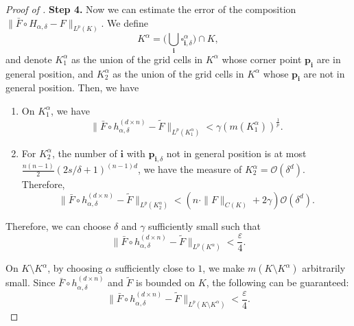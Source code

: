 \documentclass{article}
\begin{document}
\begin{proof}[Proof of ]
    \medskip
    \textbf{Step 4.}
    Now we can estimate the error of the composition $\|\bar{F}\circ H_{\alpha,\delta}-F\|_{L^p(K)}$. We define
    \[
    K^\alpha = \Big(\bigcup_{\mathbf{i}} \square_{\mathbf{i},\delta}^\alpha\Big) \cap K,
    \]
and denote $K_1^\alpha$ as the union of the grid cells in $K^\alpha$ whose corner point $\bm p_{\mathbf i}$ are in general position, and $K_2^\alpha$ as the union of the grid cells in $K^\alpha$ whose $\bm p_{\mathbf i}$ are not in general position. Then, we have
    \begin{enumerate}
        \item On $K_1^\alpha$, we have
        \begin{equation}
        \|\bar{F}\circ h_{\alpha,\delta}^{(d\times n)} - \tilde{F}\|_{L^p(K_1^\alpha)} < \gamma (m(K_1^\alpha))^{\frac{1}{p}}.
        \end{equation}
        \item For $K^\alpha_2$,  the number of $\mathbf i$ with $\bm p_{\mathbf i, \delta}$ not in general position is at most $\frac{n(n-1)}{2}(2s/\delta +1)^{(n-1)d}$, we have the measure of $K_2^\alpha = \mathcal O(\delta^{d})$.
        Therefore,
        \begin{equation}
        \|\bar{F}\circ h_{\alpha,\delta}^{(d\times n)} - \tilde{F}\|_{L^p(K_2^\alpha)} < (n\cdot \|F\|_{C(K)} + 2\gamma) \mathcal O(\delta^d).
        \end{equation}

    \end{enumerate}
    Therefore, we can choose $\delta $ and $\gamma$ sufficiently small such that
    \begin{equation}
            \|\bar{F}\circ h_{\alpha,\delta}^{(d\times n)} - \tilde{F}\|_{L^p(K^\alpha)} < \frac{\varepsilon}{4}.
    \end{equation}

On $K\setminus K^\alpha$, by choosing $\alpha$ sufficiently close to $1$, we make $m(K\setminus K^\alpha)$ arbitrarily small. Since $\bar F\circ h_{\alpha,\delta}^{(d\times n)}$ and $\tilde F$ is bounded on $K$, the following can be guaranteed:
    \begin{equation}
    \|\bar{F}\circ h_{\alpha,\delta}^{(d\times n)} - \tilde{F}\|_{L^p(K\setminus K^\alpha)} < \frac{\varepsilon}{4}.
    \end{equation}


\end{proof}
\end{document}
